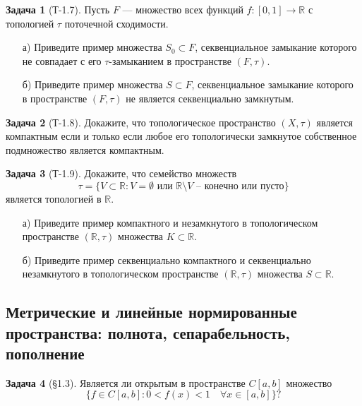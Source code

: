 \documentclass{article}
\theoremstyle{definition}
\newtheorem{problem}{Задача}
\newcommand{\R}{\mathbb R}
\begin{document}
\begin{problem}[Т-1.7]
Пусть $F$ --- множество всех функций $f\colon [0,1]\to \R$ с топологией $\tau$ поточечной сходимости.
\begin{enumerate}
\item[а)] Приведите пример множества $S_0 \subset F$, секвенциальное замыкание которого не совпадает с его $\tau$-замыканием в пространстве $(F,\tau)$.
\item[б)] Приведите пример множества $S\subset F$, секвенциальное замыкание которого в пространстве $(F,\tau)$ не является секвенциально замкнутым.
\end{enumerate}
\end{problem}

\begin{problem}[Т-1.8]
Докажите, что топологическое пространство $(X,\tau)$ является компактным
если и только если любое его топологически замкнутое собственное подмножество
является компактным.
\end{problem}

\begin{problem}[Т-1.9]
Докажите, что семейство множеств
\begin{equation*}
\tau = \{V \subset \R : V = \emptyset \text{ или } \R \setminus V \text { -- конечно или пусто}\}
\end{equation*}
является топологией в $\R$.
\begin{enumerate}
\item[а)] Приведите пример компактного и незамкнутого в топологическом пространстве $(\R, \tau)$ множества $K \subset \R$.
\item[б)] Приведите пример секвенциально компактного и секвенциально незамкнутого в топологическом пространстве $(\R, \tau)$ множества $S \subset \R$.
\end{enumerate}
\end{problem}

\subsection{Метрические и линейные нормированные пространства: полнота, сепарабельность, пополнение}

\begin{problem}[\S 1.3]
Является ли открытым в пространстве $C[a,b]$ множество
\begin{equation*}
\{f \in C[a,b] : 0 < f(x) < 1 \quad \forall x \in [a,b]\}?
\end{equation*}
\end{problem}
\end{document}
